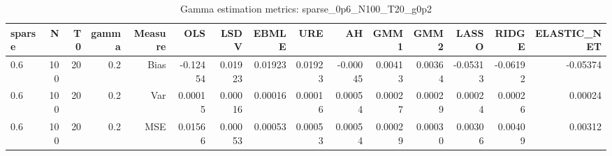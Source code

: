 \begin{table}[!htbp]\centering
\caption{Gamma estimation metrics: sparse_0p6_N100_T20_g0p2}
\label{tab:table1_sparse_0p6_N100_T20_g0p2}
\begin{tabular}{lrrrrrrrrrrrrrr}
\hline
sparse & N & T0 & gamma & Measure & OLS & LSDV & EBMLE & URE & AH & GMM1 & GMM2 & LASSO & RIDGE & ELASTIC_NET \\
\hline
0.6 & 100 & 20 & 0.2 & Bias & -0.12454 & 0.01923 & 0.01923 & 0.01923 & -0.00045 & 0.00413 & 0.00364 & -0.05313 & -0.06192 & -0.05374 \\
0.6 & 100 & 20 & 0.2 & Var & 0.00015 & 0.00016 & 0.00016 & 0.00016 & 0.00054 & 0.00027 & 0.00029 & 0.00024 & 0.00026 & 0.00024 \\
0.6 & 100 & 20 & 0.2 & MSE & 0.01566 & 0.00053 & 0.00053 & 0.00053 & 0.00054 & 0.00029 & 0.00030 & 0.00306 & 0.00409 & 0.00312 \\
\hline
\end{tabular}
\end{table}

